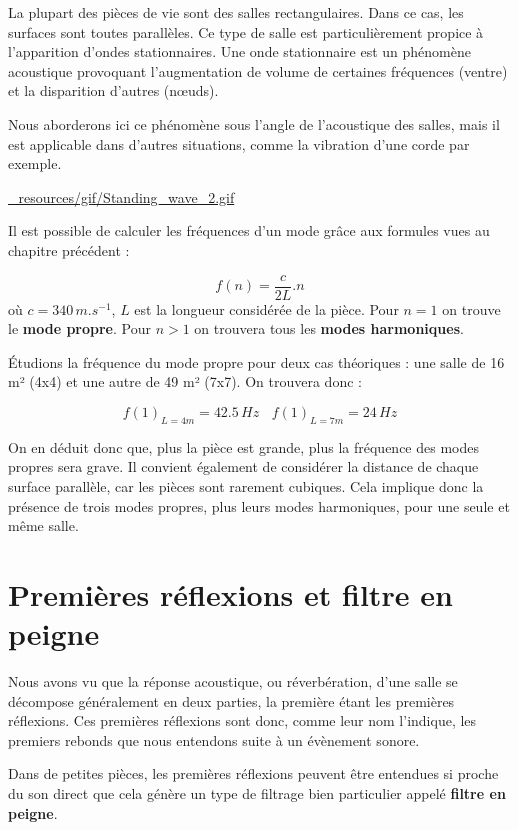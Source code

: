 \documentclass[
]{book}
\begin{document}
La plupart des pièces de vie sont des salles rectangulaires. Dans ce cas, les surfaces sont toutes parallèles. Ce type de salle est particulièrement propice à l'apparition d'ondes stationnaires. Une onde stationnaire est un phénomène acoustique provoquant l'augmentation de volume de certaines fréquences (ventre) et la disparition d'autres (nœuds).

Nous aborderons ici ce phénomène sous l'angle de l'acoustique des salles, mais il est applicable dans d'autres situations, comme la vibration d'une corde par exemple.

\url{_resources/gif/Standing_wave_2.gif}

Il est possible de calculer les fréquences d'un mode grâce aux formules vues au chapitre précédent :

\[f(n) = \frac{c}{2L}.n\]
où \(c=340\,m.s^{-1}\), \(L\) est la longueur considérée de la pièce. Pour \(n=1\) on trouve le \textbf{mode propre}. Pour \(n>1\) on trouvera tous les \textbf{modes harmoniques}.

Étudions la fréquence du mode propre pour deux cas théoriques : une salle de 16 m² (4x4) et une autre de 49 m² (7x7). On trouvera donc :

\[f(1)_{L=4m} = 42.5 \,Hz \>\>\>\> f(1)_{L=7m} = 24 \,Hz\]

On en déduit donc que, plus la pièce est grande, plus la fréquence des modes propres sera grave. Il convient également de considérer la distance de chaque surface parallèle, car les pièces sont rarement cubiques. Cela implique donc la présence de trois modes propres, plus leurs modes harmoniques, pour une seule et même salle.

\hypertarget{premiuxe8res-ruxe9flexions-et-filtre-en-peigne}{%
\section{Premières réflexions et filtre en peigne}\label{premiuxe8res-ruxe9flexions-et-filtre-en-peigne}}

Nous avons vu que la réponse acoustique, ou réverbération, d'une salle se décompose généralement en deux parties, la première étant les premières réflexions. Ces premières réflexions sont donc, comme leur nom l'indique, les premiers rebonds que nous entendons suite à un évènement sonore.

Dans de petites pièces, les premières réflexions peuvent être entendues si proche du son direct que cela génère un type de filtrage bien particulier appelé \textbf{filtre en peigne}.
\end{document}
